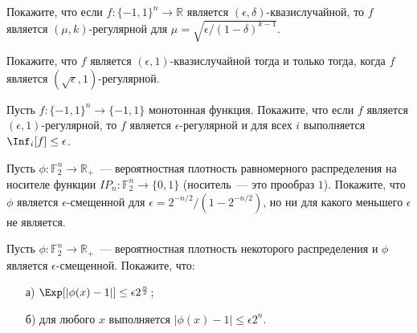 \begin{task}
    Покажите, что если $f: \{-1, 1\}^n \to \mathbb{R}$ является $(\epsilon, \delta)$-квазислучайной, то $f$ является $(\mu,
    k)$-регулярной для $\mu = \sqrt{\epsilon / (1 - \delta)^{k - 1}}$.
\end{task}


\begin{task}
    Покажите, что $f$ является $(\epsilon, 1)$-квазислучайной тогда и только тогда, когда $f$ является $(\sqrt{\epsilon},
    1)$-регулярной.
\end{task}


\begin{task}
	Пусть $f: \{-1, 1\}^{n} \to \{-1, 1\}$ монотонная функция. Покажите, что если $f$ является $(\epsilon, 1)$-регулярной, то $f$
    является $\epsilon$-регулярной и для всех $i$ выполняется $\Inf_i[f] \le \epsilon$.
\end{task}


\begin{task}
    Пусть $\phi: \mathbb{F}_2^n \to \mathbb{R}_+$~--- вероятностная плотность равномерного распределения на носителе функции
    $IP_n: \mathbb{F}_2^n \to \{0, 1\}$ (носитель~--- это прообраз $1$). Покажите, что $\phi$ является $\epsilon$-смещенной для
    $\epsilon = 2^{-n / 2}/(1 - 2^{-n / 2})$, но ни для какого меньшего $\epsilon$ не является.
\end{task}


\begin{task}
    Пусть $\phi: \mathbb{F}_2^n \to \mathbb{R}_+$~--- вероятностная плотность некоторого распределения и $\phi$ является
    $\epsilon$-смещенной. Покажите, что:
    \begin{enumerate}[topsep = 0pt, itemsep = -1ex]
        \item [а)] $\Exp[|\phi(x) - 1|] \le \epsilon 2^{\frac{n}{2}}$;
        \item [б)] для любого $x$ выполняется $|\phi(x) - 1| \le \epsilon 2^{n}$.
	\end{enumerate}
\end{task}


